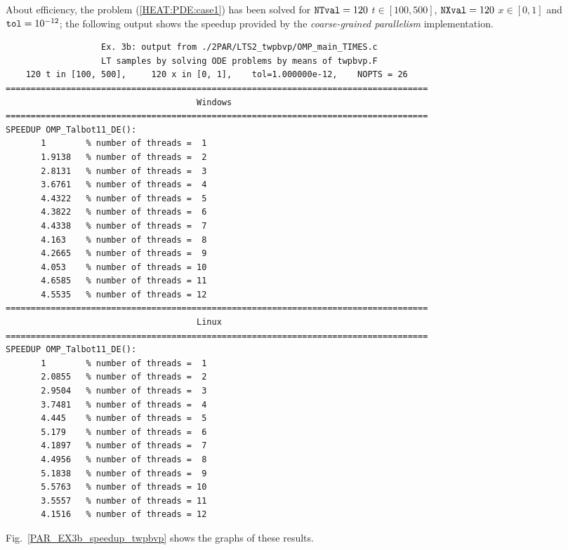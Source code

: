 \documentclass[a4paper,10pt]{report}%
\begin{document}
About efficiency, the problem (\ref{HEAT:PDE:case1}) has been solved for ${\tt NTval}=120$ $t\in[100, 500]$,
${\tt NXval}=120$ $x\in[0,1]$ and ${\tt tol}=10^{-12}$; the following output shows the speedup provided by the
{\em coarse-grained parallelism} implementation.
\begin{lstlisting}
                   Ex. 3b: output from ./2PAR/LTS2_twpbvp/OMP_main_TIMES.c
                   LT samples by solving ODE problems by means of twpbvp.F
    120 t in [100, 500],     120 x in [0, 1],    tol=1.000000e-12,    NOPTS = 26
====================================================================================
                                      Windows
====================================================================================
SPEEDUP OMP_Talbot11_DE():
       1        % number of threads =  1
       1.9138   % number of threads =  2
       2.8131   % number of threads =  3
       3.6761   % number of threads =  4
       4.4322   % number of threads =  5
       4.3822   % number of threads =  6
       4.4338   % number of threads =  7
       4.163    % number of threads =  8
       4.2665   % number of threads =  9
       4.053    % number of threads = 10
       4.6585   % number of threads = 11
       4.5535   % number of threads = 12
====================================================================================
                                      Linux
====================================================================================
SPEEDUP OMP_Talbot11_DE():
       1        % number of threads =  1
       2.0855   % number of threads =  2
       2.9504   % number of threads =  3
       3.7481   % number of threads =  4
       4.445    % number of threads =  5
       5.179    % number of threads =  6
       4.1897   % number of threads =  7
       4.4956   % number of threads =  8
       5.1838   % number of threads =  9
       5.5763   % number of threads = 10
       3.5557   % number of threads = 11
       4.1516   % number of threads = 12
\end{lstlisting}
Fig.~\ref{PAR_EX3b_speedup_twpbvp} shows the graphs of these results.
\end{document}

